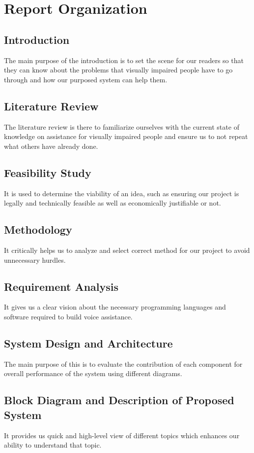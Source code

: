         \section{Report Organization}
            \subsection{Introduction}
                The main purpose of the introduction is to set the scene for our readers so that they can know about the problems that visually impaired people have to go through and how our purposed system can help them. 
            \subsection{Literature Review}
                The literature review is there to familiarize ourselves with the current state of knowledge on assistance for visually impaired people and ensure us to not repeat what others have already done. 
            \subsection{Feasibility Study}
                It is used to determine the viability of an idea, such as ensuring our project is legally and technically feasible as well as economically justifiable or not. 
            \subsection{Methodology}
                It critically helps us to analyze and select correct method for our project to avoid unnecessary hurdles. 
            \subsection{Requirement Analysis}
                It gives us a clear vision about the necessary programming languages and software required to build voice assistance. 
            \subsection{System Design and Architecture}
                The main purpose of this is to evaluate the contribution of each component for overall performance of the system using different diagrams. 
            \subsection{Block Diagram and Description of Proposed System}
                It provides us quick and high-level view of different topics which enhances our ability to understand that topic.
